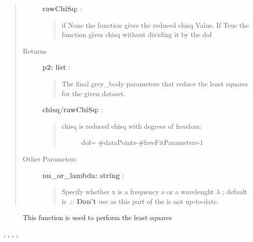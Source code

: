 \documentclass[a4paper,10pt,english]{sphinxmanual}
\begin{document}
\begin{fulllineitems}
\begin{quote}
\begin{description}
\textbf{rawChiSq:} :
\begin{quote}

if None the function gives the reduced chisq Value. If True the
function gives chisq without dividing it by the dof
\end{quote}

\item[{Returns }] \leavevmode
\textbf{p2: list} :
\begin{quote}

The final grey\_body parameters that reduce the least squares for the
given dataset.
\end{quote}

\textbf{chisq/rawChiSq:} :
\begin{quote}
\begin{description}
\item[{chisq is reduced chisq with degrees of freedom:}] \leavevmode
dof= \#dataPoints-\#freeFitParameters-1

\end{description}
\end{quote}

\item[{Other Parameters}] \leavevmode
\textbf{nu\_or\_lambda: string} :
\begin{quote}

Specify whether x is a frequency $\nu$  or
a wavelenght $\lambda$ ; default is .::
\textbf{Don't} use  as this part of the
{\hyperref[functions:astrolyze.functions.astro_functions.grey_body]{}} is not up-to-date.
\end{quote}

\end{description}\end{quote}



\begin{description}
\item[{}] \leavevmode
This function is used to perform the least squares

\end{description}

, {\hyperref[functions:astrolyze.functions.astro_functions.multi_component_grey_body]{}}, {\hyperref[functions:astrolyze.functions.astro_functions.grey_body]{}}, {\hyperref[functions:astrolyze.functions.astro_functions.black_body]{}}, 



\end{fulllineitems}
\end{document}
